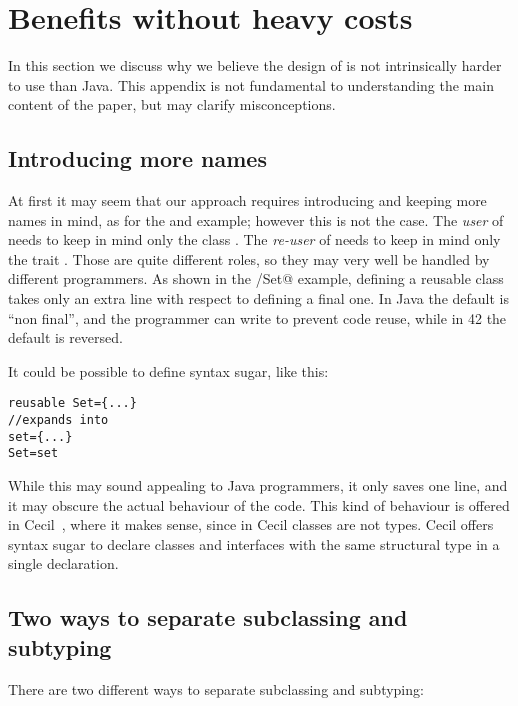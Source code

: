 \newpage\appendix



\section{Benefits without heavy costs}
In this section we discuss why we believe the design of \name
is not intrinsically harder to use than Java.
This appendix is not fundamental to understanding the main
content of the paper, but may clarify misconceptions.

\subsection{Introducing more names}
At first it may seem that our approach requires
introducing and keeping more names in mind, as for the \Q@set@ and \Q@Set@ example;
however this is not the case. 
The \emph{user} of \Q@Set@ needs to keep in mind
only the class \Q@Set@.
The \emph{re-user} of \Q@set@ needs to keep in mind only
 the trait \Q@set@.
Those are quite different roles, so they may very well
be handled by different programmers.
As shown in the \Q@set/Set@ example, defining a reusable class
takes only an extra line with respect to defining a final one.
In Java the default is ``non final'', and
the programmer can write \Q@final@ to prevent code reuse, while
in 42 the default is reversed.

It could be possible to define  syntax sugar, like this:
\begin{lstlisting}
reusable Set={...}
//expands into
set={...}
Set=set
\end{lstlisting}
While this may sound appealing to Java programmers, it only saves one line, and it may obscure the actual behaviour of the code.
This kind of behaviour is offered in Cecil~\cite{chambers1995typechecking}, where it makes sense, since in 
Cecil classes are not types.
Cecil offers syntax sugar to declare classes and
interfaces with the same structural type
in a single declaration.

\subsection{Two ways to separate subclassing and subtyping}
There are two different ways to separate subclassing and subtyping:

